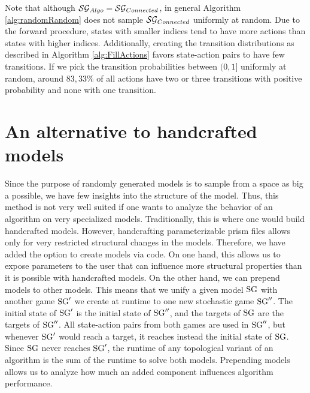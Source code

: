 Note that although $\mathcal{SG}_{Algo} = \mathcal{SG}_{Connected}$, in general Algorithm \ref{alg:randomRandom} does not sample $\mathcal{SG}_{Connected}$ uniformly at random.
Due to the forward procedure, states with smaller indices tend to have more actions than states with higher indices.
Additionally, creating the transition distributions as described in Algorithm \ref{alg:FillActions} favors state-action pairs to have few transitions.
If we pick the transition probabilities between $(0, 1]$ uniformly at random, around $83,33\%$ of all actions have two or three transitions with positive probability and 
none with one transition.

\section{An alternative to handcrafted models} \label{sec:configs}
Since the purpose of randomly generated models is to sample from a space as big a possible, we have few insights into the structure of the model.
Thus, this method is not very well suited if one wants to analyze the behavior of an algorithm on very specialized models. 
Traditionally, this is where one would build handcrafted models. 
However, handcrafting parameterizable prism files allows only for very restricted structural changes in the models. 
Therefore, we have added the option to create models via code. 
On one hand, this allows us to expose parameters to the user that can influence more structural properties than it is possible with handcrafted models.
On the other hand, we can prepend models to other models.
This means that we unify a given model $\textrm{SG}$ with another game $\textrm{SG}'$ we create at runtime to one new stochastic game $\textrm{SG}''$.
The initial state of $\textrm{SG}'$ is the initial state of $\textrm{SG}''$, and the targets of $\textrm{SG}$ are the targets of $\textrm{SG}''$.
All state-action pairs from both games are used in $\textrm{SG}''$, but whenever $\textrm{SG}'$ would reach a target, it reaches instead the initial state of $\textrm{SG}$.
Since $\textrm{SG}$ never reaches $\textrm{SG}'$, the runtime of any topological variant of an algorithm is the sum of the runtime to solve both models.
Prepending models allows us to analyze how much an added component influences algorithm performance.


